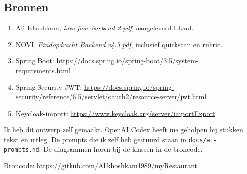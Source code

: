 \documentclass[11pt]{article}
\begin{document}
\subsection{Bronnen}
\begin{enumerate}
  \item Ali Khoshkam, \emph{idee fase backend 2.pdf}, aangeleverd lokaal.
  \item NOVI, \emph{Eindopdracht Backend v4.3.pdf}, inclusief quickscan en rubric.
  \item Spring Boot: \url{https://docs.spring.io/spring-boot/3.5/system-requirements.html}
  \item Spring Security JWT: \url{https://docs.spring.io/spring-security/reference/6.5/servlet/oauth2/resource-server/jwt.html}
  \item Keycloak-import: \url{https://www.keycloak.org/server/importExport}
\end{enumerate}

Ik heb dit ontwerp zelf gemaakt. OpenAI Codex heeft me geholpen bij stukken
tekst en uitleg. De prompts die ik zelf heb gestuurd staan in
\texttt{docs/ai-prompts.md}. De diagrammen horen bij de klassen in de broncode.

Broncode: \url{https://github.com/Alikhoshkam1989/myRestaurant}
\end{document}
